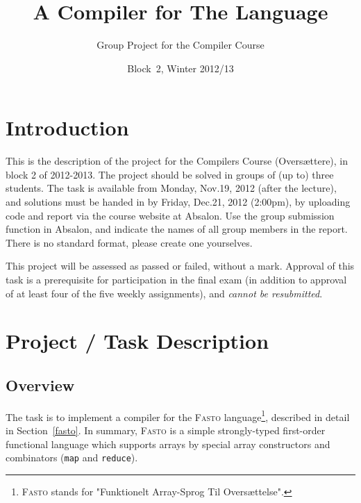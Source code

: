 \documentclass[a4paper,11pt]{article}
\title{A Compiler for The \fasto Language}
\author{Group Project for the Compiler Course}
\date{Block~2, Winter 2012/13}
\newcommand{\fasto}{\textsc{Fasto}\xspace}
\begin{document}

\maketitle

\tableofcontents

\section{Introduction}

This is the description of the project for the Compilers Course (Overs\ae{}ttere), 
in  block 2 of 2012-2013.
%
The project should be solved in groups of (up to) three students.
%
The task is available from Monday, Nov.19, 2012 (after the lecture), 
and solutions must be handed in by 
Friday, Dec.21, 2012 (2:00pm), by uploading code and report via the course website at Absalon.
Use the group submission function in Absalon, and indicate the names of all 
group members in the report. There is no standard format, please create one yourselves.

This project will be assessed as passed or failed, without a mark.
Approval of this task is a prerequisite for participation in the 
final exam (in addition to approval of at least four of the five
weekly assignments), and \emph{cannot be resubmitted}.
%



\section{Project / Task Description}

\subsection{Overview}
The task is to implement a compiler for the \fasto
language\footnote{\fasto stands for "Funktionelt Array-Sprog Til Overs\ae{}ttelse".},
described in detail in Section~\ref{fasto}.
In summary, \fasto is a simple strongly-typed first-order functional
language which supports
arrays by special array constructors and combinators 
(\texttt{map} and \texttt{reduce}).
\end{document}
